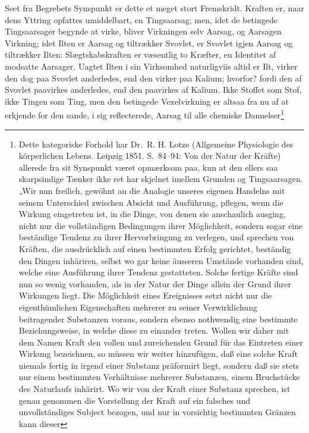 \documentclass[12pt,a4paper]{book}
\begin{document}
Seet fra Begrebets Synspunkt er dette et meget stort
Fremskridt. Kraften er, naar dens Yttring opfattes umiddelbart,
en Tingsaarsag; men, idet de betingede Tingsaarsager
begynde at virke, bliver Virkningen selv Aarsag, og Aarsagen
Virkning; idet Ilten er Aarsag og tiltrækker Svovlet, er
Svovlet igjen Aarsag og tiltrækker Ilten: Slægtskabskraften
er væsentlig to Kræfter, en Identitet af modsatte Aarsager.
Uagtet Ilten i sin Virksomhed naturligviis altid er Ilt, virker
den dog paa Svovlet anderledes, end den virker paa Kalium;
hvorfor? fordi den af Svovlet paavirkes anderledes, end den
paavirkes af Kalium. Ikke Stoffet som Stof, ikke Tingen
som Ting, men den betingede Vexelvirkning er altsaa fra nu
af at erkjende for den sande, i sig reflecterede, Aarsag til alle
chemiske Dannelser\footnote{Dette kategoriske Forhold har Dr.\ R. H.
Lotze (Allgemeine Physiologie des körperlichen Lebens. Leipzig 1851.
S.\ 84--94: Von der Natur der Kräfte) allerede fra sit Synspunkt
været opmærksom paa, kun at den ellers saa skarpsindige Tænker ikke
ret har skjelnet imellem Grunden og Tingsaarsagen. „Wir nun
freilich, gewöhnt an die Analogie unseres eigenen Handelns mit
seinem Unterschied zwischen Absicht und Ausführung, pflegen, wenn
die Wirkung eingetreten ist, in die Dinge, von denen sie anschaulich
ausging, nicht nur die vollständigen Bedingungen ihrer Möglichkeit,
sondern sogar eine beständige Tendenz zu ihrer Hervorbringung
zu verlegen, und sprechen von Kräften, die ausdrücklich auf einen
bestimmten Erfolg gerichtet, beständig den Dingen inhäriren, selbst
wo gar keine äusseren Umstände vorhanden sind, welche eine
Ausführung ihrer Tendenz gestatteten. Solche fertige Kräfte sind nun
so wenig vorhanden, als in der Natur der Dinge allein der Grund
ihrer Wirkungen liegt. Die Möglichkeit eines Ereignisses setzt nicht
nur die eigenthümlichen Eigenschaften mehrerer zu seiner
Verwirklichung beitragender Substanzen voraus, sondern ebenso
nothwendig eine bestimmte Beziehungsweise, in welche diese zu
einander treten. Wollen wir daher mit dem Namen Kraft den vollen
und zureichenden Grund für das Eintreten einer Wirkung bezeichnen,
so müssen wir weiter hinzufügen, daß eine solche Kraft
niemals fertig in irgend einer Substanz präformirt liegt, sondern
daß sie stets nur einem bestimmten Verhältnisse mehrerer Substanzen,
einem Bruchstücke des Naturlaufs inhärirt. Wo wir von
der Kraft einer Substanz sprechen, ist genau genommen die
Vorstellung der Kraft auf ein falsches und unvollständiges Subject
bezogen, und nur in vorsichtig bestimmten Gränzen kann dieser
}
\end{document}

